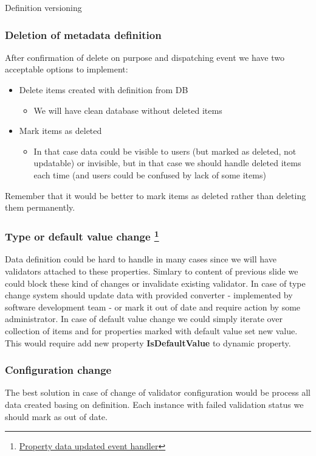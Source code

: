 \documentclass{beamer}
\begin{document}
\begin{section}{Definition versioning}
\begin{frame}
\frametitle{Deletion of metadata definition}
After confirmation of delete on purpose and dispatching event we have two acceptable options to implement: 
\begin{itemize}
	\item Delete items created with definition from DB
		\begin{itemize}
			\item We will have clean database without deleted items
		\end{itemize}
	\item Mark items as deleted 
		\begin{itemize}
			\item In that case data could be visible to users (but marked as deleted, not updatable) or invisible, but in that case we should handle deleted items each time (and users could be confused by lack of some items)
		\end{itemize}
\end{itemize}
Remember that it would be better to mark items as deleted rather than deleting them permanently. 
\end{frame}

\begin{frame}
\frametitle{Type or default value change \footnote[1]{\href{https://github.com/paqaos/DynamicMetadata-SFI2021/blob/main/MovieDatabase/MovieDatabase/CommandStack/EventHandlers/MetadataDefinitions/PropertyDefinitionUpdatedEventHandler.cs}{Property data updated event handler}}}
Data definition could be hard to handle in many cases since we will have validators attached to these properties. Simlary to content of previous slide we could block these kind of changes or invalidate existing validator.
\newline
In case of type change system should update data with provided converter - implemented by software development team - or mark it out of date and require action by some administrator. 
\newline
In case of default value change we could simply iterate over collection of items and for properties marked with default value set new value. This would require add new property \textbf{IsDefaultValue} to dynamic property. 

\end{frame}

\begin{frame}
\frametitle{Configuration change}
The best solution in case of change of validator configuration would be process all data created basing on definition. Each instance with failed validation status we should mark as out of date. 


\end{frame}
\end{section}
\end{document}
